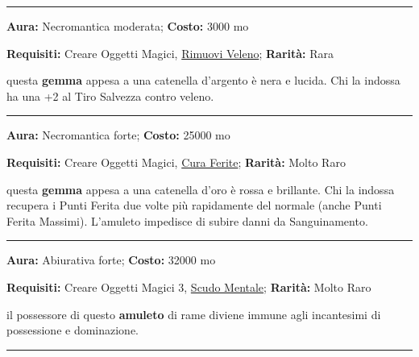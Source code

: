 \begin{multicols}{2}
\smallskip\noindent\rule{\linewidth}{2pt}  \hypertarget{AmuletoAntiveleno}{}\smallskip{}\noindent\label{AmuletoAntiveleno}

\textbf{Aura:} Necromantica moderata; \textbf{Costo:} 3000 mo

\textbf{Requisiti:} Creare Oggetti Magici, \hyperlink{Rimuovi Veleno}{Rimuovi Veleno}; \textbf{Rarità:} Rara

questa \textbf{gemma} appesa a una catenella d'argento è nera e lucida. Chi la indossa ha una +2 al Tiro Salvezza contro veleno.

\smallskip\noindent\rule{\linewidth}{2pt}  \hypertarget{AmuletoCicatrizzante}{}\smallskip{}\noindent\label{AmuletoCicatrizzante}

\textbf{Aura:} Necromantica forte; \textbf{Costo:} 25000 mo

\textbf{Requisiti:} Creare Oggetti Magici, \hyperlink{Cura Ferite}{Cura Ferite}; \textbf{Rarità:} Molto Raro

questa \textbf{gemma} appesa a una catenella d'oro è rossa e brillante. Chi la indossa recupera i Punti Ferita due volte più rapidamente del normale (anche Punti Ferita Massimi). L'amuleto impedisce di subire danni da Sanguinamento.

\smallskip\noindent\rule{\linewidth}{2pt}  \hypertarget{AmuletoControlaPossessione}{}\smallskip{}\noindent\label{AmuletoControlaPossessione}

\textbf{Aura:} Abiurativa forte; \textbf{Costo:} 32000 mo

\textbf{Requisiti:} Creare Oggetti Magici 3, \hyperlink{AnellodelloScudoMentale}{Scudo Mentale}; \textbf{Rarità:} Molto Raro

il possessore di questo \textbf{amuleto} di rame diviene immune agli incantesimi di possessione e dominazione.

\smallskip\noindent\rule{\linewidth}{2pt}  \hypertarget{AmuletodellaCancrena}{}\smallskip{}\noindent\label{AmuletodellaCancrena}


\end{multicols}
